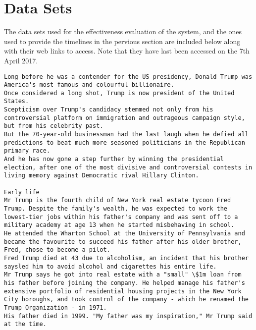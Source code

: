 \section{Data Sets}
\par The data sets used for the effectiveness evaluation of the system, and the ones used to provide the timelines in the pervious section are included below along with their web links to access. Note that they have last been accessed on the 7th April 2017.

\begin{lstlisting}[numberstyle=\tiny\color{black},  keywordstyle=\color{black},  commentstyle=\color{black},  stringstyle=\color{black},caption={BBC: US elections 2016 results: Donald Trump's life story. Published on the 20th of January 2017. URL: http://www.bbc.com/news/world-us-canada-35318432}, captionpos=t]
Long before he was a contender for the US presidency, Donald Trump was America's most famous and colourful billionaire. 
Once considered a long shot, Trump is now president of the United States. 
Scepticism over Trump's candidacy stemmed not only from his controversial platform on immigration and outrageous campaign style, but from his celebrity past. 
But the 70-year-old businessman had the last laugh when he defied all predictions to beat much more seasoned politicians in the Republican primary race. 
And he has now gone a step further by winning the presidential election, after one of the most divisive and controversial contests in living memory against Democratic rival Hillary Clinton. 
 
Early life 
Mr Trump is the fourth child of New York real estate tycoon Fred Trump. Despite the family's wealth, he was expected to work the lowest-tier jobs within his father's company and was sent off to a military academy at age 13 when he started misbehaving in school. 
He attended the Wharton School at the University of Pennsylvania and became the favourite to succeed his father after his older brother, Fred, chose to become a pilot. 
Fred Trump died at 43 due to alcoholism, an incident that his brother saysled him to avoid alcohol and cigarettes his entire life. 
Mr Trump says he got into real estate with a "small" \$1m loan from his father before joining the company. He helped manage his father's extensive portfolio of residential housing projects in the New York City boroughs, and took control of the company - which he renamed the Trump Organization - in 1971. 
His father died in 1999. "My father was my inspiration," Mr Trump said at the time. 
 

\end{lstlisting}

